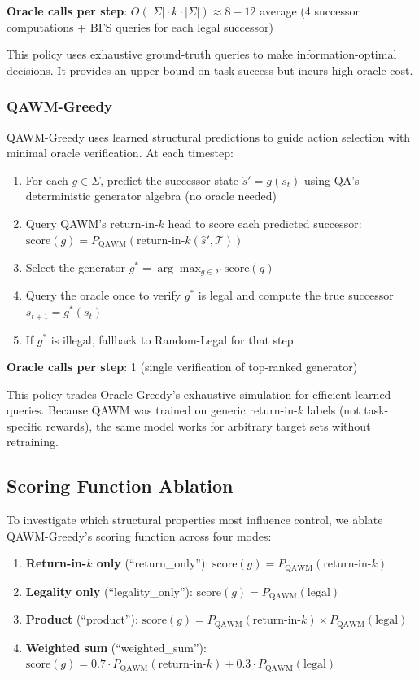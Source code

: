 \textbf{Oracle calls per step}: $O(|\Sigma| \cdot k \cdot |\Sigma|) \approx 8{-}12$ average (4 successor computations + BFS queries for each legal successor)

This policy uses exhaustive ground-truth queries to make information-optimal decisions. It provides an upper bound on task success but incurs high oracle cost.

\subsubsection{QAWM-Greedy}

QAWM-Greedy uses learned structural predictions to guide action selection with minimal oracle verification. At each timestep:

\begin{enumerate}
\item For each $g \in \Sigma$, predict the successor state $\hat{s}' = g(s_t)$ using QA's deterministic generator algebra (no oracle needed)
\item Query QAWM's return-in-$k$ head to score each predicted successor: $\text{score}(g) = P_{\text{QAWM}}(\text{return-in-}k(\hat{s}', \mathcal{T}))$
\item Select the generator $g^* = \arg\max_{g \in \Sigma} \text{score}(g)$
\item Query the oracle once to verify $g^*$ is legal and compute the true successor $s_{t+1} = g^*(s_t)$
\item If $g^*$ is illegal, fallback to Random-Legal for that step
\end{enumerate}

\textbf{Oracle calls per step}: 1 (single verification of top-ranked generator)

This policy trades Oracle-Greedy's exhaustive simulation for efficient learned queries. Because QAWM was trained on generic return-in-$k$ labels (not task-specific rewards), the same model works for arbitrary target sets without retraining.

\subsection{Scoring Function Ablation}

To investigate which structural properties most influence control, we ablate QAWM-Greedy's scoring function across four modes:

\begin{enumerate}
\item \textbf{Return-in-$k$ only} (``return\_only''): $\text{score}(g) = P_{\text{QAWM}}(\text{return-in-}k)$
\item \textbf{Legality only} (``legality\_only''): $\text{score}(g) = P_{\text{QAWM}}(\text{legal})$
\item \textbf{Product} (``product''): $\text{score}(g) = P_{\text{QAWM}}(\text{return-in-}k) \times P_{\text{QAWM}}(\text{legal})$
\item \textbf{Weighted sum} (``weighted\_sum''): $\text{score}(g) = 0.7 \cdot P_{\text{QAWM}}(\text{return-in-}k) + 0.3 \cdot P_{\text{QAWM}}(\text{legal})$
\end{enumerate}

